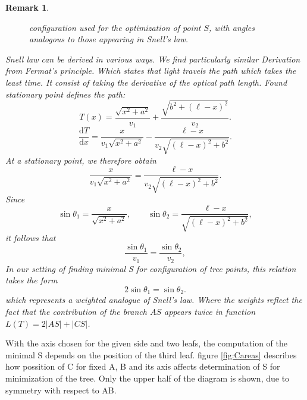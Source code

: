 \documentclass[openany]{book}
\newtheorem{remark}{Remark}
\begin{document}
\begin{remark}
\begin{figure}
		\caption{configuration used for the optimization of point \(S\), with angles analogous to those appearing in Snell's law.}
		\label{fig:Snell}
	\end{figure}
		
		Snell law can be derived in various ways. We find particularly similar Derivation from Fermat's principle. Which states that light travels the path which takes the least time.
		It consist of taking the derivative of the optical path length. Found stationary point defines the path:
		\[
		T(x)=\frac{\sqrt{x^2+a^2}}{v_1}+\frac{\sqrt{b^2+(\ell-x)^2}}{v_2}.
		\]
		\[
		\frac{\mathrm d T}{\mathrm d x}
		=
		\frac{x}{v_1\sqrt{x^2+a^2}}
		-
		\frac{\ell-x}{v_2\sqrt{(\ell-x)^2+b^2}}.
		\]
		At a stationary point, we therefore obtain
		\[
		\frac{x}{v_1\sqrt{x^2+a^2}}
		=
		\frac{\ell-x}{v_2\sqrt{(\ell-x)^2+b^2}}.
		\]
		Since
		\[
		\sin\theta_1=\frac{x}{\sqrt{x^2+a^2}},
		\qquad
		\sin\theta_2=\frac{\ell-x}{\sqrt{(\ell-x)^2+b^2}},
		\]
		it follows that
		\[
		\frac{\sin\theta_1}{v_1}=\frac{\sin\theta_2}{v_2},
		\]
		In our setting of finding minimal S for configuration of tree points, this relation takes the form
		\[
		2 \sin \theta_1 = \sin \theta_2.
		\]
		which represents a weighted analogue of Snell's law. Where the weights reflect the fact that the contribution of the branch \(AS\) appears twice in function \(L(T)=2|AS|+|CS|\).
	\end{remark}	

	With the axis chosen for the given side and two leafs, the computation of the minimal S depends on the position of the third leaf.
	figure \ref{fig:Careas} describes how possition of C for fixed A, B and its axis affects determination of S for minimization of the tree. Only the upper half of the diagram is shown, due to symmetry with respect to AB. 
	
\end{document}
